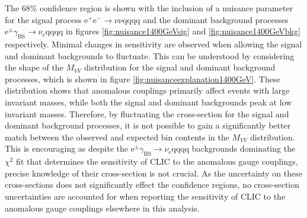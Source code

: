 The 68\% confidence region is shown with the inclusion of a nuisance parameter for the signal process $\text{e}^{+}\text{e}^{-} \rightarrow \nu{\nu}\text{qqqq}$ and the dominant background processes $\text{e}^{\pm}\gamma_{\text{BS}} \rightarrow \nu_{\text{e}}\text{qqqq}$ in figures \ref{fig:nuisance1400GeVsig} and \ref{fig:nuisance1400GeVbkg} respectively.  Minimal changes in sensitivity are observed when allowing the signal and dominant backgrounds to fluctuate.  This can be understood by considering the shape of the $M_{VV}$ distribution for the signal and dominant background processes, which is shown in figure \ref{fig:nuisanceexplanation1400GeV}.  These distribution shows that anomalous couplings primarily affect events with large invariant masses, while both the signal and dominant backgrounds peak at low invariant masses.  Therefore, by fluctuating the cross-section for the signal and dominant background processes, it is not possible to gain a significantly better match between the observed and expected bin contents in the $M_{VV}$ distribution.  This is encouraging as despite the $\text{e}^{\pm}\gamma_{\text{BS}} \rightarrow \nu_{\text{e}}\text{qqqq}$ backgrounds dominating the $\chi^{2}$ fit that determines the sensitivity of CLIC to the anomalous gauge couplings, precise knowledge of their cross-section is not crucial.  As the uncertainty on these cross-sections does not significantly effect the confidence regions, no cross-section uncertainties are accounted for when reporting the sensitivity of CLIC to the anomalous gauge couplings elsewhere in this analysis.   

